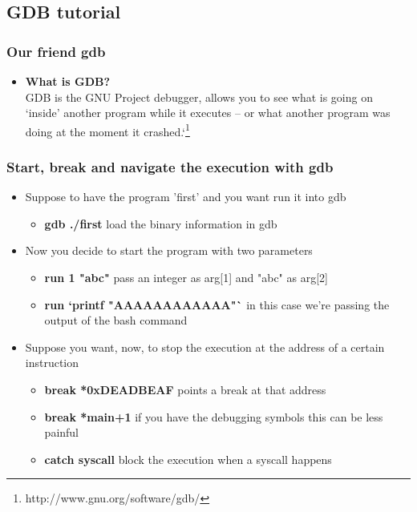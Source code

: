 \documentclass[]{beamer}
\begin{document}
\subsection{GDB tutorial}
        \begin{frame}
        \frametitle{Our friend gdb}
        \begin{itemize}
            \item{{\bf What is GDB?}}\\
            GDB is the GNU Project debugger, allows you to see what is going on `inside' another program while it executes -- or what another program was doing at the moment it crashed.`\footnote{http://www.gnu.org/software/gdb/}
        \end{itemize}
      \end{frame}
            \begin{frame}
        \frametitle{Start, break and navigate the execution with gdb}
        \begin{itemize}
            \item{Suppose to have the program 'first' and you want run it into gdb }\\
            \begin{itemize}
                \item{{\bf gdb ./first} load the binary information in gdb}
            \end{itemize}
            \item{Now you decide to start the program with two parameters}\\
            \begin{itemize}
                \item{{\bf run 1 "abc"} pass an integer as arg[1] and "abc" as arg[2]}
                \item{{\bf run `printf "AAAAAAAAAAAA"`} in this case we're passing the output of the bash command}
            \end{itemize}
            \item{Suppose you want, now, to stop the execution at the address of a certain instruction}\\
            \begin{itemize}
                \item{{\bf break *0xDEADBEAF} points a break at that address}
                \item{{\bf break *main+1} if you have the debugging symbols this can be less painful}
                \item{{\bf catch syscall} block the execution when a syscall happens}
            \end{itemize}
        \end{itemize}
      \end{frame}
\end{document}
